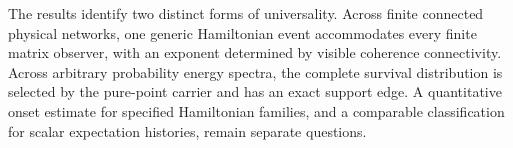 The results identify two distinct forms of universality.
Across finite connected physical networks, one generic Hamiltonian
event accommodates every finite matrix observer, with an exponent
determined by visible coherence connectivity. Across arbitrary
probability energy spectra, the complete survival distribution is
selected by the pure-point carrier and has an exact support edge.
A quantitative onset estimate for specified Hamiltonian families,
and a comparable classification for scalar expectation histories,
remain separate questions.

